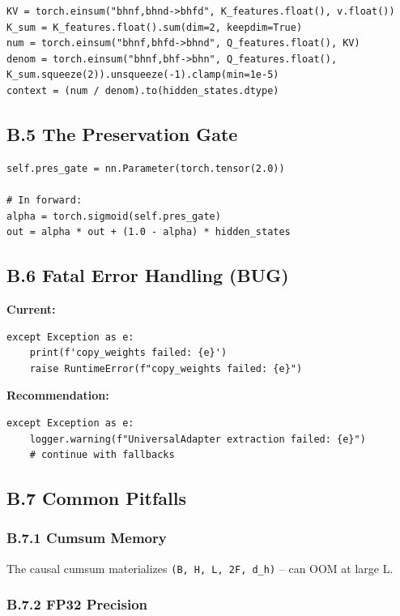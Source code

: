 \begin{lstlisting}
KV = torch.einsum("bhnf,bhnd->bhfd", K_features.float(), v.float())
K_sum = K_features.float().sum(dim=2, keepdim=True)
num = torch.einsum("bhnf,bhfd->bhnd", Q_features.float(), KV)
denom = torch.einsum("bhnf,bhf->bhn", Q_features.float(), K_sum.squeeze(2)).unsqueeze(-1).clamp(min=1e-5)
context = (num / denom).to(hidden_states.dtype)
\end{lstlisting}

\subsection{B.5 The Preservation Gate}

\begin{lstlisting}
self.pres_gate = nn.Parameter(torch.tensor(2.0))

# In forward:
alpha = torch.sigmoid(self.pres_gate)
out = alpha * out + (1.0 - alpha) * hidden_states
\end{lstlisting}

\subsection{B.6 Fatal Error Handling (BUG)}

\textbf{Current:}
\begin{lstlisting}
except Exception as e:
    print(f'copy_weights failed: {e}')
    raise RuntimeError(f"copy_weights failed: {e}")
\end{lstlisting}

\textbf{Recommendation:}
\begin{lstlisting}
except Exception as e:
    logger.warning(f"UniversalAdapter extraction failed: {e}")
    # continue with fallbacks
\end{lstlisting}

\subsection{B.7 Common Pitfalls}

\subsubsection{B.7.1 Cumsum Memory}

The causal cumsum materializes \texttt{(B, H, L, 2F, d\_h)} -- can OOM at 
large L.

\subsubsection{B.7.2 FP32 Precision}


